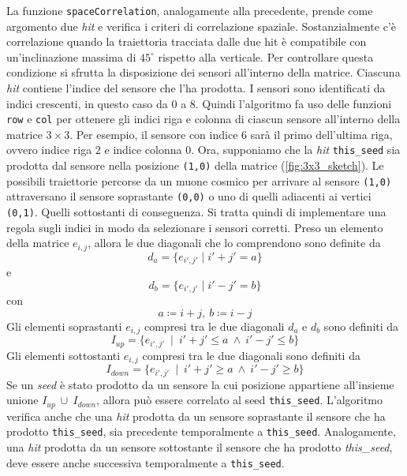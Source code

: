 \documentclass[../main.tex]{subfiles}
\begin{document}
La funzione \texttt{spaceCorrelation}, analogamente alla precedente, prende come argomento due \emph{hit} e verifica i criteri di correlazione spaziale.
Sostanzialmente c'è correlazione quando la traiettoria tracciata dalle due hit è compatibile con un'inclinazione massima di $45^\circ$ rispetto alla verticale. Per controllare questa condizione si sfrutta la disposizione dei sensori all'interno della matrice.
Ciascuna \emph{hit} contiene l'indice del sensore che l'ha prodotta. I sensori sono identificati da indici crescenti, in questo caso da $0$ a $8$. Quindi l'algoritmo fa uso delle funzioni \texttt{row} e \texttt{col} per ottenere gli indici riga e colonna di ciascun sensore all'interno della matrice $3 \times 3$. Per esempio, il sensore con indice $6$ sarà il primo dell'ultima riga, ovvero indice riga $2$ e indice colonna $0$.
Ora, supponiamo che la \emph{hit} \texttt{this\_seed} sia prodotta dal sensore nella posizione \texttt{(1,0)} della matrice (\autoref{fig:3x3_sketch}). Le possibili traiettorie percorse da un muone cosmico per arrivare al sensore \texttt{(1,0)} attraversano il sensore soprastante \texttt{(0,0)} o uno di quelli adiacenti ai vertici \texttt{(0,1)}. Quelli sottostanti di conseguenza. 
Si tratta quindi di implementare una regola sugli indici in modo da selezionare i sensori corretti. Preso un elemento della matrice $e_{i,j}$, allora le due diagonali che lo comprendono sono definite da
\begin{equation}
	d_a = \{ e_{i',j'} \mid i' + j' = a\}
\end{equation}
e 
\begin{equation}
	d_b = \{ e_{i',j'} \mid i' - j' = b\}
\end{equation}
con 
\begin{equation}
a \coloneqq i + j \mathrm{,}\ b \coloneqq i - j
\end{equation}
Gli elementi soprastanti $e_{i,j}$ compresi tra le due diagonali $d_a$ e $d_b$ sono definiti da
\begin{equation}
	I_{up} = \{ e_{i',j'}\ \mid\ i' + j' \leq a\ \land\ i' - j' \leq b\}
\end{equation}
Gli elementi sottostanti $e_{i,j}$ compresi tra le due diagonali sono definiti da 
\begin{equation}
	I_{down} = \{ e_{i',j'}\ \mid\ i' + j' \geq a\ \land\ i' - j' \geq b\}
\end{equation}
Se un \emph{seed} è stato prodotto da un sensore la cui posizione appartiene all'insieme unione $I_{up}\ \cup\ I_{down}$, allora può essere correlato al seed \texttt{this\_seed}.
L'algoritmo verifica anche che una \emph{hit} prodotta da un sensore soprastante il sensore che ha prodotto \texttt{this\_seed}, sia precedente temporalmente a \texttt{this\_seed}. Analogamente, una \emph{hit} prodotta da un sensore sottostante il sensore che ha prodotto \emph{this\_seed}, deve essere anche successiva temporalmente a \texttt{this\_seed}.
\end{document}
